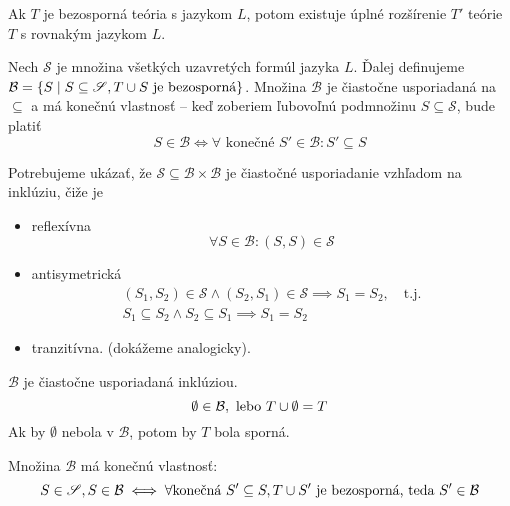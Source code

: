 \begin{veta}[Lindenbaum]
    Ak $T$ je bezosporná teória s jazykom $L$, potom existuje úplné
    rozšírenie $T'$ teórie $T$ s rovnakým jazykom $L$.
\end{veta}

\begin{dokaz}
    Nech $\mathscr{S}$ je množina všetkých uzavretých formúl jazyka $L$.
    Ďalej definujeme
    $\mathcal{B} = \{ S \mid S \subseteq \mathscr{S}, T \cup S
        \mbox{ je bezosporná}\}$.
    Množina $\mathcal{B}$ je čiastočne usporiadaná na $\subseteq$ a
    má konečnú vlastnosť -- keď zoberiem ľubovoľnú podmnožinu
    $S \subseteq \mathscr{S}$, bude platiť
    \begin{equation*}
        S \in \mathcal{B} \iff \forall \mbox{ konečné } S' \in
        \mathcal{B}: S' \subseteq S
    \end{equation*}

     Potrebujeme ukázať, že $\mathscr{S} \subseteq
     \mathcal{B}\times\mathcal{B}$ je čiastočné usporiadanie vzhľadom
     na inklúziu, čiže je

    \begin{itemize}
        \item reflexívna
            \begin{equation*}
                \forall S \in \mathcal{B}: (S,S) \in \mathscr{S}
            \end{equation*}
        \item antisymetrická
            \begin{align*}
                (S_1,S_2) \in \mathscr{S} \land (S_2,S_1) \in \mathscr{S}
                    \implies S_1 = S_2, \quad \mbox{t.j.} \\
                S_1 \subseteq S_2 \land S_2 \subseteq S_1 \implies S_1 = S_2
            \end{align*}
        \item tranzitívna. (dokážeme analogicky).
    \end{itemize}

    $\mathcal{B}$ je čiastočne usporiadaná inklúziou.
    \begin{equation*}
        \emptyset \in \mathcal{B}, \mbox{ lebo } T \cup \emptyset = T
    \end{equation*}
    Ak by $\emptyset$ nebola v $\mathcal{B}$, potom by $T$ bola sporná.

    Množina $\mathcal{B}$ má konečnú vlastnosť:
    \begin{equation*}
        S \in \mathscr{S}, S \in \mathcal{B} \iff \forall \textrm{konečná }S' \subseteq S, T \cup S' 
            \textrm{ je bezosporná, teda }S' \in \mathcal{B}
    \end{equation*}


\end{dokaz}
